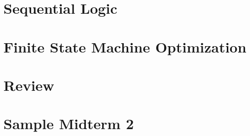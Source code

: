 \documentclass[oneside]{book}
\begin{document}
\chapter{Sequential Logic}

%
%
%
\chapter{Finite State Machine Optimization}

\chapter*{Review}

\chapter{Sample Midterm 2}

% 
% 
% 
%



\end{document}
